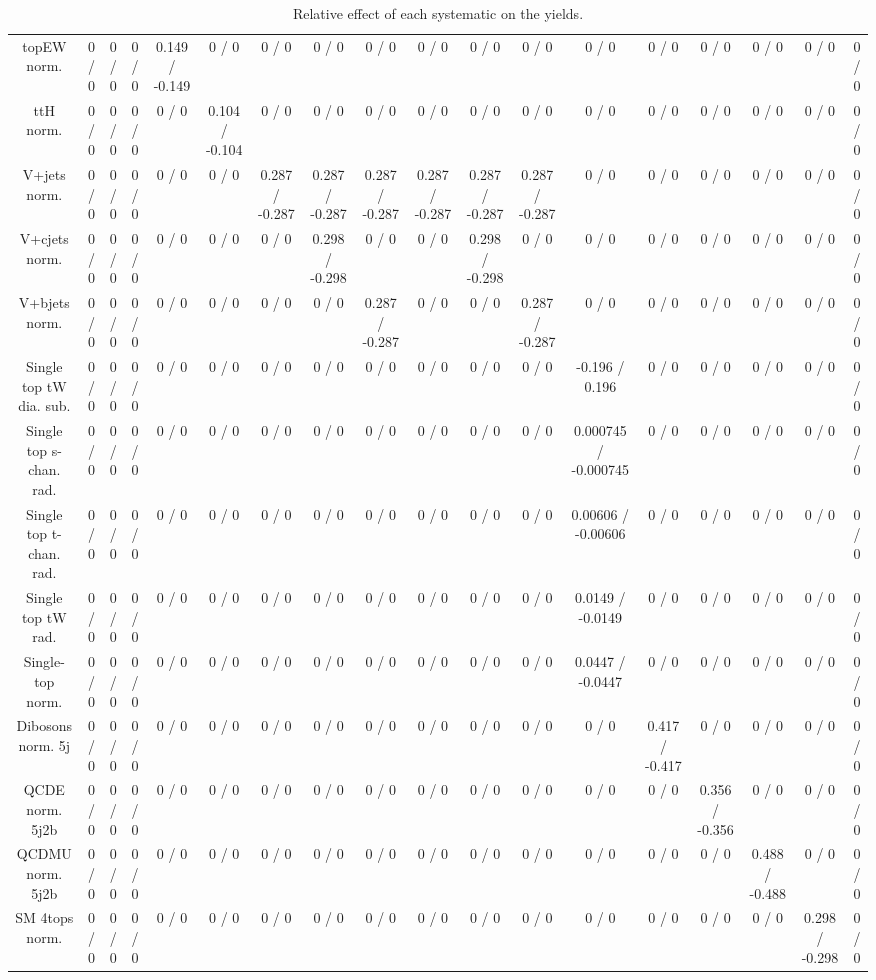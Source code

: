 \documentclass[10pt]{article}
\begin{document}
\begin{table}[htbp]
\begin{center}
\begin{tabular}{|c|c|c|c|c|c|c|c|c|c|c|c|c|c|c|c|c|c|}
  topEW norm. & 0 / 0 & 0 / 0 & 0 / 0 & 0.149 / -0.149 & 0 / 0 & 0 / 0 & 0 / 0 & 0 / 0 & 0 / 0 & 0 / 0 & 0 / 0 & 0 / 0 & 0 / 0 & 0 / 0 & 0 / 0 & 0 / 0 & 0 / 0 \\ 
  ttH norm. & 0 / 0 & 0 / 0 & 0 / 0 & 0 / 0 & 0.104 / -0.104 & 0 / 0 & 0 / 0 & 0 / 0 & 0 / 0 & 0 / 0 & 0 / 0 & 0 / 0 & 0 / 0 & 0 / 0 & 0 / 0 & 0 / 0 & 0 / 0 \\ 
  V+jets norm. & 0 / 0 & 0 / 0 & 0 / 0 & 0 / 0 & 0 / 0 & 0.287 / -0.287 & 0.287 / -0.287 & 0.287 / -0.287 & 0.287 / -0.287 & 0.287 / -0.287 & 0.287 / -0.287 & 0 / 0 & 0 / 0 & 0 / 0 & 0 / 0 & 0 / 0 & 0 / 0 \\ 
  V+cjets norm. & 0 / 0 & 0 / 0 & 0 / 0 & 0 / 0 & 0 / 0 & 0 / 0 & 0.298 / -0.298 & 0 / 0 & 0 / 0 & 0.298 / -0.298 & 0 / 0 & 0 / 0 & 0 / 0 & 0 / 0 & 0 / 0 & 0 / 0 & 0 / 0 \\ 
  V+bjets norm. & 0 / 0 & 0 / 0 & 0 / 0 & 0 / 0 & 0 / 0 & 0 / 0 & 0 / 0 & 0.287 / -0.287 & 0 / 0 & 0 / 0 & 0.287 / -0.287 & 0 / 0 & 0 / 0 & 0 / 0 & 0 / 0 & 0 / 0 & 0 / 0 \\ 
  Single top tW dia. sub. & 0 / 0 & 0 / 0 & 0 / 0 & 0 / 0 & 0 / 0 & 0 / 0 & 0 / 0 & 0 / 0 & 0 / 0 & 0 / 0 & 0 / 0 & -0.196 / 0.196 & 0 / 0 & 0 / 0 & 0 / 0 & 0 / 0 & 0 / 0 \\ 
  Single top s-chan. rad. & 0 / 0 & 0 / 0 & 0 / 0 & 0 / 0 & 0 / 0 & 0 / 0 & 0 / 0 & 0 / 0 & 0 / 0 & 0 / 0 & 0 / 0 & 0.000745 / -0.000745 & 0 / 0 & 0 / 0 & 0 / 0 & 0 / 0 & 0 / 0 \\ 
  Single top t-chan. rad. & 0 / 0 & 0 / 0 & 0 / 0 & 0 / 0 & 0 / 0 & 0 / 0 & 0 / 0 & 0 / 0 & 0 / 0 & 0 / 0 & 0 / 0 & 0.00606 / -0.00606 & 0 / 0 & 0 / 0 & 0 / 0 & 0 / 0 & 0 / 0 \\ 
  Single top tW rad. & 0 / 0 & 0 / 0 & 0 / 0 & 0 / 0 & 0 / 0 & 0 / 0 & 0 / 0 & 0 / 0 & 0 / 0 & 0 / 0 & 0 / 0 & 0.0149 / -0.0149 & 0 / 0 & 0 / 0 & 0 / 0 & 0 / 0 & 0 / 0 \\ 
  Single-top norm. & 0 / 0 & 0 / 0 & 0 / 0 & 0 / 0 & 0 / 0 & 0 / 0 & 0 / 0 & 0 / 0 & 0 / 0 & 0 / 0 & 0 / 0 & 0.0447 / -0.0447 & 0 / 0 & 0 / 0 & 0 / 0 & 0 / 0 & 0 / 0 \\ 
  Dibosons norm. 5j & 0 / 0 & 0 / 0 & 0 / 0 & 0 / 0 & 0 / 0 & 0 / 0 & 0 / 0 & 0 / 0 & 0 / 0 & 0 / 0 & 0 / 0 & 0 / 0 & 0.417 / -0.417 & 0 / 0 & 0 / 0 & 0 / 0 & 0 / 0 \\ 
  QCDE norm. 5j2b & 0 / 0 & 0 / 0 & 0 / 0 & 0 / 0 & 0 / 0 & 0 / 0 & 0 / 0 & 0 / 0 & 0 / 0 & 0 / 0 & 0 / 0 & 0 / 0 & 0 / 0 & 0.356 / -0.356 & 0 / 0 & 0 / 0 & 0 / 0 \\ 
  QCDMU norm. 5j2b & 0 / 0 & 0 / 0 & 0 / 0 & 0 / 0 & 0 / 0 & 0 / 0 & 0 / 0 & 0 / 0 & 0 / 0 & 0 / 0 & 0 / 0 & 0 / 0 & 0 / 0 & 0 / 0 & 0.488 / -0.488 & 0 / 0 & 0 / 0 \\ 
  SM 4tops norm. & 0 / 0 & 0 / 0 & 0 / 0 & 0 / 0 & 0 / 0 & 0 / 0 & 0 / 0 & 0 / 0 & 0 / 0 & 0 / 0 & 0 / 0 & 0 / 0 & 0 / 0 & 0 / 0 & 0 / 0 & 0.298 / -0.298 & 0 / 0 \\ 
\hline 
\end{tabular} 
\caption{Relative effect of each systematic on the yields.} 
\end{center} 
\end{table} 
\end{document}
